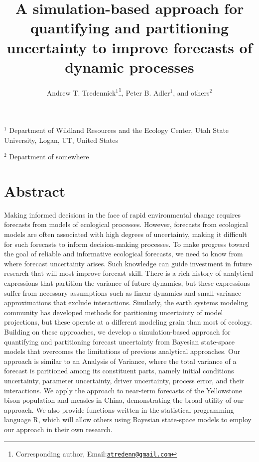 \documentclass[12pt,]{article}
\title{A simulation-based approach for quantifying and partitioning uncertainty
to improve forecasts of dynamic processes}
\author{Andrew T. Tredennick\(^{1}\)\footnote{Corresponding author,
  Email:\href{mailto:atredenn@gmail.com}{\nolinkurl{atredenn@gmail.com}}},
Peter B. Adler\(^1\), and others\(^{2}\)}
\date{}
\begin{document}
\maketitle

\newcommand{\smalltodo}[2][]
    {\todo[caption={#2}, #1]
    {\begin{spacing}{0.5}#2\end{spacing}}}\setlength{\abovedisplayskip}{0pt}\raggedright\setlength{\parindent}{36pt}

\noindent{}\(^1\) Department of Wildland Resources and the Ecology
Center, Utah State University, Logan, UT, United States

\noindent{}\(^2\) Department of somewhere

\hypertarget{abstract}{%
\section{Abstract}\label{abstract}}

Making informed decisions in the face of rapid environmental change
requires forecasts from models of ecological processes. However,
forecasts from ecological models are often associated with high degrees
of uncertainty, making it difficult for such forecasts to inform
decision-making processes. To make progress toward the goal of reliable
and informative ecological forecasts, we need to know from where
forecast uncertainty arises. Such knowledge can guide investment in
future research that will most improve forecast skill. There is a rich
history of analytical expressions that partition the variance of future
dynamics, but these expressions suffer from necessary assumptions such
as linear dynamics and small-variance approximations that exclude
interactions. Similarly, the earth systems modeling community has
developed methods for paritioning uncertainty of model projections, but
these operate at a different modeling grain than most of ecology.
Building on these approaches, we develop a simulation-based approach for
quantifying and partitioning forecast uncertainty from Bayesian
state-space models that overcomes the limitations of previous analytical
approaches. Our approach is similar to an Analysis of Variance, where
the total variance of a forecast is paritioned among its constituent
parts, namely initial conditions uncertainty, parameter uncertainty,
driver uncertainty, process error, and their interactions. We apply the
approach to near-term forecasts of the Yellowstone bison population and
measles in China, demonstrating the broad utility of our approach. We
also provide functions written in the statistical programming language
R, which will allow others using Bayesian state-space models to employ
our approach in their own research.
\end{document}
